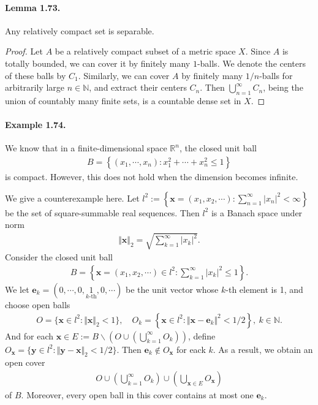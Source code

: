 \documentclass{article}
\begin{document}
\paragraph{Lemma 1.73.\label{lemma:1.73}} Any relatively compact set is separable.
\begin{proof}
	Let $A$ be a relatively compact subset of a metric space $X$. Since $A$ is totally bounded, we can cover it by finitely many $1$-balls. We denote the centers of these balls by $C_1$. Similarly, we can cover $A$ by finitely many $1/n$-balls for arbitrarily large $n\in\mathbb{N}$, and extract their centers $C_n$. Then $\bigcup_{n=1}^\infty C_n$, being the union of countably many finite sets, is a countable dense set in $X$.
\end{proof}

\paragraph{Example 1.74.\label{example:1.74}} We know that in a finite-dimensional space $\mathbb{R}^n$, the closed unit ball \begin{align*}
	B=\left\{(x_1,\cdots,x_n):x_1^2 + \cdots + x_n^2 \leq 1\right\}
\end{align*}
is compact. However, this does not hold when the dimension becomes infinite.
\vspace{0.1cm}

We give a counterexample here. Let $l^2:=\left\{\mathbf{x}=(x_1,x_2,\cdots):\sum_{n=1}^\infty \vert x_n\vert^2<\infty\right\}$ be the set of square-summable real sequences. Then $l^2$ is a Banach space under norm
\begin{align*}
	\Vert\mathbf{x}\Vert_2 = \sqrt{\sum_{k=1}^\infty\vert x_k\vert^2}.
\end{align*}
Consider the closed unit ball
\begin{align*}
	B=\left\{\mathbf{x}=(x_1,x_2,\cdots)\in l^2:\sum_{k=1}^\infty\vert x_k\vert^2 \leq 1\right\}.
\end{align*}
We let $\mathbf{e}_k=(0,\cdots,0,\underset{k\text{-th}}{1},0,\cdots)$ be the unit vector whose $k$-th element is 1, and choose open balls \begin{align*}
	O=\{\mathbf{x}\in l^2:\Vert\mathbf{x}\Vert_2 <1\},\quad O_k=\left\{\mathbf{x}\in l^2:\Vert\mathbf{x}-\mathbf{e}_k\Vert^2 < 1/2\right\},\ k\in\mathbb{N}.
\end{align*}
And for each $\mathbf{x}\in E:= B\backslash\left(O\cup\left(\bigcup_{k=1}^\infty O_k\right)\right)$, define $O_{\mathbf{x}}=\{\mathbf{y}\in l^2:\Vert\mathbf{y}-\mathbf{x}\Vert_2< 1/2\}$. Then $\mathbf{e}_k\notin O_\mathbf{x}$ for eack $k$. As a result, we obtain an open cover
\begin{align*}
	O\cup \left(\bigcup_{k=1}^\infty O_k\right)\cup\left(\bigcup_{\mathbf{x}\in E}O_\mathbf{x}\right)
\end{align*}
of $B$. Moreover, every open ball in this cover contains at most one $\mathbf{e}_k$.
\end{document}
